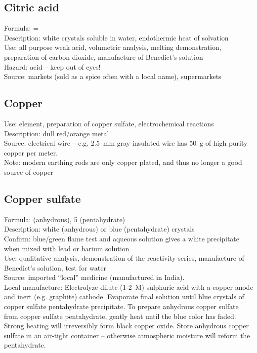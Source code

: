 \subsection{Citric acid}
Formula:  = \\
Description: white crystals soluble in water, 
endothermic heat of solvation\\
Use: all purpose weak acid, 
volumetric analysis, 
melting demonstration, 
preparation of carbon dioxide, 
manufacture of Benedict's solution\\
Hazard: acid – keep out of eyes!\\
Source: markets (sold as a spice often with a local name), 
supermarkets
\subsection{Copper}
\label{sec:copper}
Use: element, 
preparation of copper sulfate, 
electrochemical reactions\\
Description: dull red/orange metal\\
Source: electrical wire -- e.g. 
2.5~mm gray insulated wire has 50~g of high purity copper per meter.\\
Note: modern earthing rods are only copper plated, 
and thus no longer a good source of copper
\subsection{Copper sulfate}
Formula:  (anhydrous), 
 5 (pentahydrate)\\
Description: white (anhydrous) or blue (pentahydrate) crystals\\
Confirm: blue/green flame test 
and aqueous solution gives a white precipitate 
when mixed with lead or barium solution\\
Use: qualitative analysis, 
demonstration of the reactivity series, 
manufacture of Benedict's solution, 
test for water\\
Source: imported ``local'' medicine (manufactured in India).\\ 
Local manufacture: Electrolyze dilute (1-2~M) sulphuric acid 
with a copper anode and inert (e.g. 
graphite) cathode. 
Evaporate final solution until 
blue crystals of copper sulfate pentahydrate precipitate. 
To prepare anhydrous copper sulfate from copper sulfate pentahydrate, 
gently heat until the blue color has faded. 
Strong heating will irreversibly form black copper oxide. 
Store anhydrous copper sulfate in an air-tight container -- 
otherwise atmospheric moisture will reform the pentahydrate.
